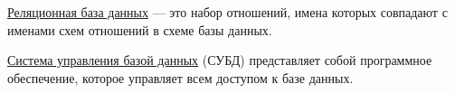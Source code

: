 \uline{Реляционная база данных} --- это набор отношений, имена которых совпадают с именами схем отношений в схеме базы данных.~\cite{lecnotes}

\uline{Система управления базой данных} (СУБД) представляет собой программное обеспечение, которое управляет всем доступом к базе данных.~\cite[с. 87]{date}
